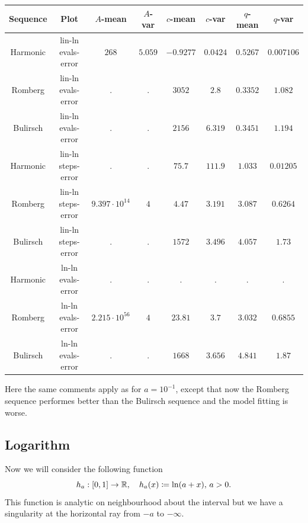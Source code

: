 \begin{table}[H]
    \centering
    \small
    \begin{tabular}{c|c||c|c|c|c|c	|c}
Sequence & Plot & \(A\)-mean & \(A\)-var & \(c\)-mean & \(c\)-var & \(q\)-mean & \(q\)-var\\\hline
Harmonic & lin-ln evals-error & \(268\) & \(5.059\) & \(-0.9277\) & \(0.0424\) & \(0.5267\) & \(0.007106\) \\
Romberg & lin-ln evals-error & \(.\) & \(.\) & \(3052\) & \(2.8\) & \(0.3352\) & \(1.082\) \\
Bulirsch & lin-ln evals-error & \(.\) & \(.\) & \(2156\) & \(6.319\) & \(0.3451\) & \(1.194\) \\
Harmonic & lin-ln steps-error & \(.\) & \(.\) & \(75.7\) & \(111.9\) & \(1.033\) & \(0.01205\) \\
Romberg & lin-ln steps-error & \(9.397\cdot 10^{14}\) & \(4\) & \(4.47\) & \(3.191\) & \(3.087\) & \(0.6264\) \\
Bulirsch & lin-ln steps-error & \(.\) & \(.\) & \(1572\) & \(3.496\) & \(4.057\) & \(1.73\) \\
Harmonic & ln-ln evals-error & . & . & . & . & . & . \\
Romberg & ln-ln evals-error & \(2.215\cdot 10^{56}\) & \(4\) & \(23.81\) & \(3.7\) & \(3.032\) & \(0.6855\) \\
Bulirsch & ln-ln evals-error & \(.\) & \(.\) & \(1668\) & \(3.656\) & \(4.841\) & \(1.87\) \\
    \end{tabular}
    \label{tab:my_label}
\end{table}

Here the same comments apply as for \(a = 10^{-1}\), except that now the Romberg sequence performes better than the Bulirsch sequence and the model fitting is worse.

\subsection{Logarithm}

Now we will consider the following function 
\[
h_a: [0, 1] \rightarrow \mathbb{R}, \quad h_a(x) \coloneqq \ln(a + x),\, a > 0.
\]
This function is analytic on neighbourhood about the interval but we have a singularity at the horizontal ray from \(-a\) to \(-\infty\).

